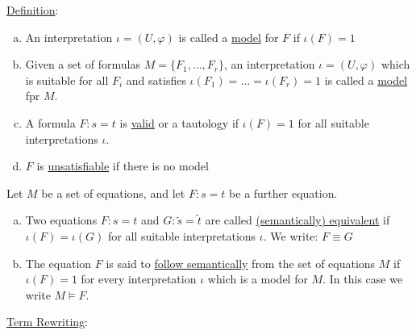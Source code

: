 \documentclass[a4paper]{article}
\newcommand{\ul}{\underline}
\let\phi\varphi
\begin{document}
\ul{Definition}:
\begin{enumerate}[(a)]
	\item An interpretation $\iota=(U,\phi)$ is called a \ul{model} for $F$ if $\iota(F)=1$
	\item Given a set of formulas $M=\{F_1,\dots,F_r\}$, an interpretation $\iota=(U,\phi)$ which is suitable for all $F_i$ and satisfies $\iota(F_1)=\dots=\iota(F_r)=1$ is called a \ul{model} fpr $M$.
	\item A formula $F:s=t$ is \ul{valid} or a tautology if $\iota(F)=1$ for all suitable interpretations $\iota$.
	\item $F$ is \ul{unsatisfiable} if there is no model
\end{enumerate}
Let $M$ be a set of equations, and let $F:s=t$ be a further equation.
\begin{enumerate}[(a)]
	\item Two equations $F:s=t$ and $G:\tilde s=\tilde t$ are called \ul{(semantically) equivalent} if $\iota(F)=\iota(G)$ for all suitable interpretations $\iota$. We write: $F\equiv G$
	\item The equation $F$ is said to \ul{follow semantically} from the set of equations $M$ if $\iota(F)=1$ for every interpretation $\iota$ which is a model for $M$. In this case we write $M\models F$.
\end{enumerate}
\ul{Term Rewriting}:
\end{document}

